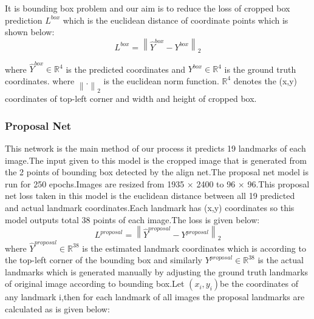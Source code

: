 \documentclass[sn-mathphys]{sn-jnl}%
\theoremstyle{thmstyleone}%
\theoremstyle{thmstyletwo}%
\theoremstyle{thmstylethree}%
\begin{document}
\par It is bounding box problem and our aim is  to reduce  the loss of cropped box  prediction \begin{math} L^{box} \end{math} which is the euclidean distance of coordinate points which is shown below:
\begin{equation}
    L^{box} = \left \| \hat{Y}^{box} - Y^{box} \right \|_{2}
\end{equation}

where \begin{math} \hat{Y}^{box} \in \mathbb{R}^{4} \end{math} is the predicted coordinates  and \begin{math} Y^{box} \in \mathbb{R}^{4} \end{math}  is the ground truth coordinates. where \begin{math} \left \| . \right \|_{2} \end{math} is the euclidean norm function. \begin{math}  \mathbb{R}^{4} \end{math}  denotes the (x,y) coordinates of top-left corner  and width and height of cropped box.



\subsubsection{Proposal Net}
This network is the main method of our process it predicts 19 landmarks of each image.The input given to this model is the cropped image that is generated from the 2 points of bounding box detected by the align net.The proposal net model is run for 250 epochs.Images are resized from 1935 × 2400 to 96 × 96.This proposal net loss taken in this model is the euclidean distance between all 19 predicted and actual landmark coordinates.Each landmark has (x,y) coordinates so this model outputs total 38 points of each image.The loss is given below:
\begin{equation}
    L^{proposal} = \left \| \hat{Y}^{proposal} - Y^{proposal} \right \|_{2}
\end{equation}
where
\begin{math} \hat{Y}^{proposal} \in \mathbb{R}^{38} \end{math} is the estimated landmark coordinates which is according to the top-left corner of the bounding box and similarly \begin{math} Y^{proposal} \in \mathbb{R}^{38}  \end{math} is the actual landmarks which is generated manually by adjusting the ground truth landmarks of original image according to bounding box.Let \begin{math} (x_{i},y_{i}) \end{math}be the coordinates of any landmark i,then for each landmark of all images the proposal landmarks are calculated as is given below:
\end{document}
